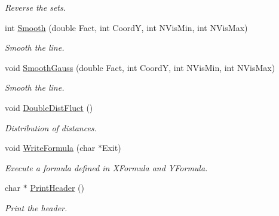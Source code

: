 \begin{DoxyCompactItemize}
\begin{DoxyCompactList}\small\item\em \-Reverse the sets. \end{DoxyCompactList}\item 
\hypertarget{classVarDatFile_a42240e743f2a3ea3b430b915e50c5350}{int \hyperlink{classVarDatFile_a42240e743f2a3ea3b430b915e50c5350}{\-Smooth} (double \-Fact, int \-Coord\-Y, int \-N\-Vis\-Min, int \-N\-Vis\-Max)}\label{classVarDatFile_a42240e743f2a3ea3b430b915e50c5350}

\begin{DoxyCompactList}\small\item\em \-Smooth the line. \end{DoxyCompactList}\item 
\hypertarget{classVarDatFile_a12fe98e58e8262bcbf3aef114673673d}{void \hyperlink{classVarDatFile_a12fe98e58e8262bcbf3aef114673673d}{\-Smooth\-Gauss} (double \-Fact, int \-Coord\-Y, int \-N\-Vis\-Min, int \-N\-Vis\-Max)}\label{classVarDatFile_a12fe98e58e8262bcbf3aef114673673d}

\begin{DoxyCompactList}\small\item\em \-Smooth the line. \end{DoxyCompactList}\item 
\hypertarget{classVarDatFile_a6ab47ee0a227e3e13f042327b1f8fe33}{void \hyperlink{classVarDatFile_a6ab47ee0a227e3e13f042327b1f8fe33}{\-Double\-Dist\-Fluct} ()}\label{classVarDatFile_a6ab47ee0a227e3e13f042327b1f8fe33}

\begin{DoxyCompactList}\small\item\em \-Distribution of distances. \end{DoxyCompactList}\item 
\hypertarget{classVarDatFile_aedcb20a2169e38b38a21ad3f8bf011d2}{void \hyperlink{classVarDatFile_aedcb20a2169e38b38a21ad3f8bf011d2}{\-Write\-Formula} (char $\ast$\-Exit)}\label{classVarDatFile_aedcb20a2169e38b38a21ad3f8bf011d2}

\begin{DoxyCompactList}\small\item\em \-Execute a formula defined in \-X\-Formula and \-Y\-Formula. \end{DoxyCompactList}\item 
\hypertarget{classVarDatFile_ac6c6d90214b93afffeab31fd2bbe5715}{char $\ast$ \hyperlink{classVarDatFile_ac6c6d90214b93afffeab31fd2bbe5715}{\-Print\-Header} ()}\label{classVarDatFile_ac6c6d90214b93afffeab31fd2bbe5715}

\begin{DoxyCompactList}\small\item\em \-Print the header. \end{DoxyCompactList}\end{DoxyCompactItemize}
